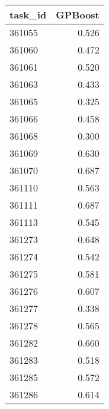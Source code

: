 \begin{tabular}{lr}
\toprule
task\_id & GPBoost \\
\midrule
361055 & 0.526 \\
361060 & 0.472 \\
361061 & 0.520 \\
361063 & 0.433 \\
361065 & 0.325 \\
361066 & 0.458 \\
361068 & 0.300 \\
361069 & 0.630 \\
361070 & 0.687 \\
361110 & 0.563 \\
361111 & 0.687 \\
361113 & 0.545 \\
361273 & 0.648 \\
361274 & 0.542 \\
361275 & 0.581 \\
361276 & 0.607 \\
361277 & 0.338 \\
361278 & 0.565 \\
361282 & 0.660 \\
361283 & 0.518 \\
361285 & 0.572 \\
361286 & 0.614 \\
\bottomrule
\end{tabular}
